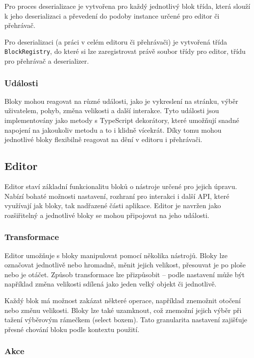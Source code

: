 Pro proces deserializace je vytvořena pro každý jednotlivý blok třída, která slouží k jeho deserializaci a převedení do podoby instance určené pro editor či přehrávač.

Pro deserializaci (a práci v celém editoru či přehrávači) je vytvořená třída \texttt{BlockRegistry}, do které si lze zaregistrovat právě soubor třídy pro editor, třídu pro přehrávač a deserializer. 

\subsubsection{Události}

Bloky mohou reagovat na různé události, jako je vykreslení na stránku, výběr uživatelem, pohyb, změna velikosti a další interakce.
Tyto události jsou implementovány jako metody s TypeScript dekorátory, které umožňují snadné napojení na jakoukoliv metodu a to i klidně vícekrát.
Díky tomu mohou jednotlivé bloky flexibilně reagovat na dění v editoru i přehrávači.

\subsection{Editor}

Editor staví základní funkcionalitu bloků o nástroje určené pro jejich úpravu. 
Nabízí bohaté možnosti nastavení, rozhraní pro interakci i další API, které využívají jak bloky, tak nadřazené části aplikace.
Editor je navržen jako rozšiřitelný a jednotlivé bloky se mohou připojovat na jeho události.

\subsubsection{Transformace}

Editor umožňuje s bloky manipulovat pomocí několika nástrojů. 
Bloky lze označovat jednotlivě nebo hromadně, měnit jejich velikost, přesouvat je po ploše nebo je otáčet. 
Způsob transformace lze přizpůsobit -- podle nastavení může být například změna velikosti sdílená jako jeden velký objekt či jednotlivě.

Každý blok má možnost zakázat některé operace, například znemožnit otočení nebo změnu velikosti. 
Bloky lze také uzamknout, což znemožní jejich výběr při tažení výběrovým rámečkem (select boxem). 
Tato granularita nastavení zajišťuje přesné chování bloku podle kontextu použití.

\subsubsection{Akce}


